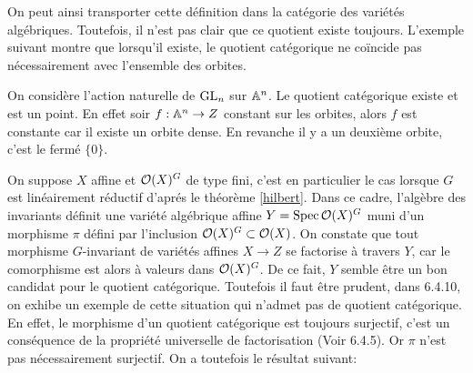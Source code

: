 On peut ainsi transporter cette définition dans la catégorie des variétés algébriques. Toutefois, il n'est pas clair que ce quotient existe toujours. L'exemple suivant montre que lorsqu'il existe, le quotient catégorique ne coïncide pas nécessairement avec l'ensemble des orbites.

\begin{ex}
On considère l'action naturelle de $\operatorname{GL}_n$ sur $\mathbb{A}^n$. Le quotient catégorique existe et est un point. En effet soir $f:\mathbb{A}^n\rightarrow Z$ constant sur les orbites, alors $f$ est constante car il existe un orbite dense. En revanche il y a un deuxième orbite, c'est le fermé $\lbrace 0\rbrace$. 
\end{ex}

On suppose $X$ affine et $\mathcal{O}(X)^G$ de type fini, c'est en particulier le cas lorsque $G$ est linéairement réductif d'aprés le théorème \ref{hilbert}. Dans ce cadre, l'algèbre des invariants définit une variété algébrique affine $Y=\operatorname{Spec} \mathcal{O}(X)^G$ muni d'un morphisme $\pi$ défini par l'inclusion $\mathcal{O}(X)^G\subset \mathcal{O}(X)$. On constate que tout morphisme $G$-invariant de variétés affines $X\rightarrow Z$ se factorise à travers $Y$, car le comorphisme est alors à valeurs dans $\mathcal{O}(X)^G$. De ce fait, $Y$ semble être un bon candidat pour le quotient catégorique. Toutefois il faut être prudent, dans \cite{LAGFerrer} 6.4.10, on exhibe un exemple de cette situation qui n'admet pas de quotient catégorique. En effet, le morphisme d'un quotient catégorique est toujours surjectif, c'est un conséquence de la propriété universelle de factorisation (Voir  \cite{LAGFerrer} 6.4.5). Or $\pi$ n'est pas nécessairement surjectif. On a toutefois le résultat suivant:

